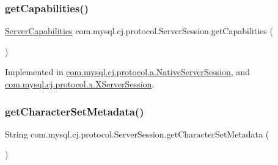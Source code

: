 \mbox{\label{interfacecom_1_1mysql_1_1cj_1_1protocol_1_1_server_session_a99f2361800e1d3df0a1ab516e4c80737}} 
\subsubsection{\texorpdfstring{get\+Capabilities()}{getCapabilities()}}
{\footnotesize\ttfamily \mbox{\hyperlink{interfacecom_1_1mysql_1_1cj_1_1protocol_1_1_server_capabilities}{Server\+Capabilities}} com.\+mysql.\+cj.\+protocol.\+Server\+Session.\+get\+Capabilities (\begin{DoxyParamCaption}{ }\end{DoxyParamCaption})}



Implemented in \mbox{\hyperlink{classcom_1_1mysql_1_1cj_1_1protocol_1_1a_1_1_native_server_session_a482ab0553e0ed36382b3224cf302844e}{com.\+mysql.\+cj.\+protocol.\+a.\+Native\+Server\+Session}}, and \mbox{\hyperlink{classcom_1_1mysql_1_1cj_1_1protocol_1_1x_1_1_x_server_session_a71d555b1492164b97f0efe51c235b674}{com.\+mysql.\+cj.\+protocol.\+x.\+X\+Server\+Session}}.

\mbox{\label{interfacecom_1_1mysql_1_1cj_1_1protocol_1_1_server_session_a3aeeeb80107544ed93be2c73124bf53f}} 
\subsubsection{\texorpdfstring{get\+Character\+Set\+Metadata()}{getCharacterSetMetadata()}}
{\footnotesize\ttfamily String com.\+mysql.\+cj.\+protocol.\+Server\+Session.\+get\+Character\+Set\+Metadata (\begin{DoxyParamCaption}{ }\end{DoxyParamCaption})}



